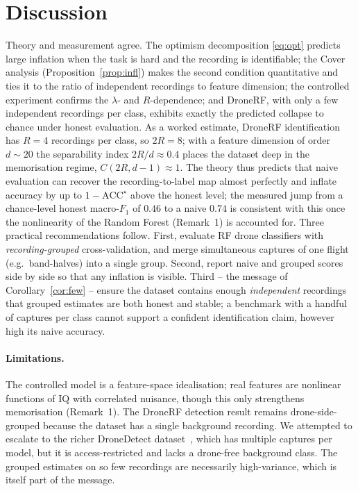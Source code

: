 \documentclass[11pt]{article}
\begin{document}
\section{Discussion}
Theory and measurement agree. The optimism decomposition \eqref{eq:opt} predicts large inflation when the task is hard and the recording is identifiable; the Cover analysis (Proposition~\ref{prop:infl}) makes the second condition quantitative and ties it to the ratio of independent recordings to feature dimension; the controlled experiment confirms the $\lambda$- and $R$-dependence; and DroneRF, with only a few independent recordings per class, exhibits exactly the predicted collapse to chance under honest evaluation. As a worked estimate, DroneRF identification has $R=4$ recordings per class, so $2R=8$; with a feature dimension of order $d\sim20$ the separability index $2R/d\approx0.4$ places the dataset deep in the memorisation regime, $C(2R,d{-}1)\approx1$. The theory thus predicts that naive evaluation can recover the recording-to-label map almost perfectly and inflate accuracy by up to $1-\mathrm{ACC}^\star$ above the honest level; the measured jump from a chance-level honest macro-$F_1$ of $0.46$ to a naive $0.74$ is consistent with this once the nonlinearity of the Random Forest (Remark~1) is accounted for. Three practical recommendations follow. First, evaluate RF drone classifiers with \emph{recording-grouped} cross-validation, and merge simultaneous captures of one flight (e.g.\ band-halves) into a single group. Second, report naive and grouped scores side by side so that any inflation is visible. Third -- the message of Corollary~\ref{cor:few} -- ensure the dataset contains enough \emph{independent} recordings that grouped estimates are both honest and stable; a benchmark with a handful of captures per class cannot support a confident identification claim, however high its naive accuracy.

\paragraph{Limitations.} The controlled model is a feature-space idealisation; real features are nonlinear functions of IQ with correlated nuisance, though this only strengthens memorisation (Remark~1). The DroneRF detection result remains drone-side-grouped because the dataset has a single background recording. We attempted to escalate to the richer DroneDetect dataset~\cite{dronedetect}, which has multiple captures per model, but it is access-restricted and lacks a drone-free background class. The grouped estimates on so few recordings are necessarily high-variance, which is itself part of the message.
\end{document}
